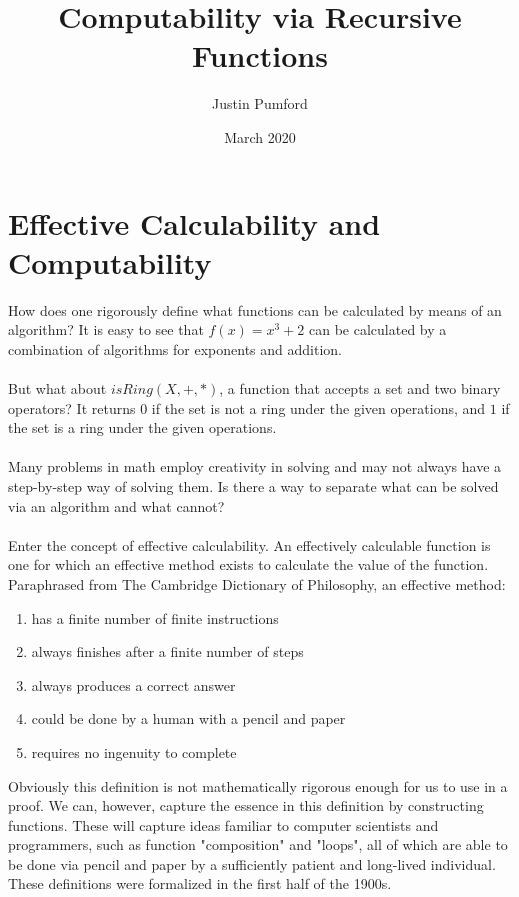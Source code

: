 \documentclass[12pt, letterpaper]{article}
\title{Computability via Recursive Functions}
\author{Justin Pumford  }
\date{March 2020}
\theoremstyle{case}
\begin{document}
  \maketitle

  \section{Effective Calculability and Computability}
    How does one rigorously define what functions can be calculated by means of an algorithm?
    It is easy to see that $f(x) = x^3 + 2$ can be calculated by a combination of algorithms for exponents
    and addition.
    \\
    \\
    But what about $isRing(X, +, *)$, a function that accepts a set and two binary operators?
    It returns $0$ if the set is not a ring under the given operations, and $1$ if the set is a ring under the given operations.
    \\
    \\
    Many problems in math employ creativity in solving and may not always have a step-by-step way of solving them.
    Is there a way to separate what can be solved via an algorithm and what cannot?
    \\
    \\
    Enter the concept of effective calculability. An effectively calculable function is one for which an effective method 
    exists to calculate the value of the function. Paraphrased from The Cambridge Dictionary of Philosophy, an effective method:
    \begin{enumerate}
      \item has a finite number of finite instructions
      \item always finishes after a finite number of steps
      \item always produces a correct answer
      \item could be done by a human with a pencil and paper
      \item requires no ingenuity to complete
    \end{enumerate}
    Obviously this definition is not mathematically rigorous enough for us to use in a proof.
    We can, however, capture the essence in this definition by constructing functions. These will capture ideas familiar
    to computer scientists and programmers, such as function "composition" and "loops", all of which are able to be done via pencil and 
    paper by a sufficiently patient and long-lived individual. These definitions were formalized in the first half of the 1900s.
\end{document}
